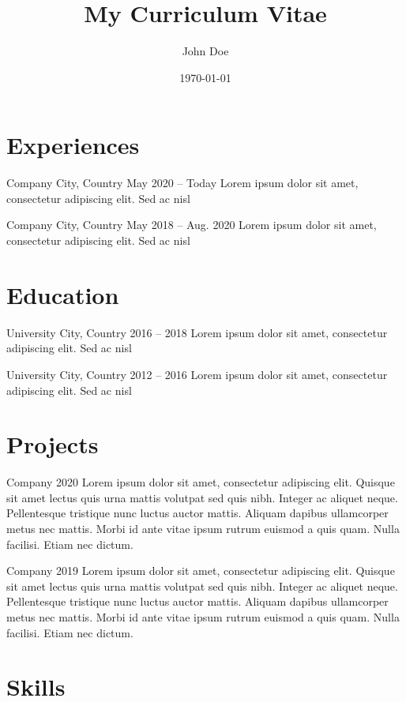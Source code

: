 \documentclass[english]{resume-template}
\title{My Curriculum Vitae}
\author{John Doe}
\date{\today}
\begin{document}
\section{Experiences}
           {Company}
           {City, Country}
           {May 2020 -- Today}
           {
            Lorem ipsum dolor sit amet, consectetur adipiscing elit. Sed ac nisl
           }

           {Company}
           {City, Country}
           {May 2018 -- Aug. 2020}
           {
            Lorem ipsum dolor sit amet, consectetur adipiscing elit. Sed ac nisl
           }

\section{Education}
           {University}
           {City, Country}
           {2016 -- 2018}
           {
            Lorem ipsum dolor sit amet, consectetur adipiscing elit. Sed ac nisl
           }

           {University}
           {City, Country}
           {2012 -- 2016}
           {
            Lorem ipsum dolor sit amet, consectetur adipiscing elit. Sed ac nisl
           }

\section{Projects}
           {Company}
           {}
           {2020}
           {
            Lorem ipsum dolor sit amet, consectetur adipiscing elit. Quisque sit amet lectus quis urna mattis volutpat sed quis nibh. Integer ac aliquet neque. Pellentesque tristique nunc luctus auctor mattis. Aliquam dapibus ullamcorper metus nec mattis. Morbi id ante vitae ipsum rutrum euismod a quis quam. Nulla facilisi. Etiam nec dictum.
           }

           {Company}
           {}
           {2019}
           {
            Lorem ipsum dolor sit amet, consectetur adipiscing elit. Quisque sit amet lectus quis urna mattis volutpat sed quis nibh. Integer ac aliquet neque. Pellentesque tristique nunc luctus auctor mattis. Aliquam dapibus ullamcorper metus nec mattis. Morbi id ante vitae ipsum rutrum euismod a quis quam. Nulla facilisi. Etiam nec dictum.
           }

\section{Skills}
\end{document}
